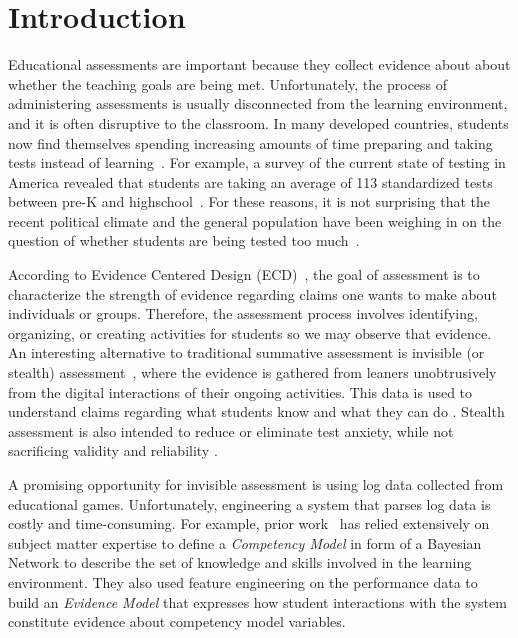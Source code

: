 \documentclass{sigchi}
\begin{document}
\section{Introduction}
Educational assessments are important because they collect evidence about about  whether  the teaching goals are being met.
Unfortunately, the process of  administering assessments is usually disconnected from the learning environment, and  it is often  disruptive to the classroom. 
In many developed countries, students now find themselves spending increasing amounts of time preparing and taking tests instead of learning~\cite{hofman2015rebalancing}.
For example, a  survey of the current state of testing in America revealed that students are taking an average of 113 standardized tests between pre-K and highschool~\cite{lazarin2014testing}. 
For these reasons, it is not surprising that the recent political climate and the general population have been weighing in on the question of whether students are being tested too much~\cite{lazarin2014testing}.


According to Evidence Centered Design (ECD)~\cite{mislevy2012design}, the goal of assessment is to characterize the strength of evidence regarding claims one wants to make about individuals or groups.
Therefore, the assessment process involves identifying, organizing, or creating activities for students so we may observe that evidence.
An interesting alternative to traditional summative assessment is invisible (or stealth) assessment~\cite{shute2013stealth},
where the evidence is gathered from leaners unobtrusively from the digital interactions of their ongoing activities.
This data is used  to understand claims regarding what students know and what they can do \cite{shute2009melding}.
Stealth assessment is also intended to reduce or eliminate test anxiety, while not sacrificing validity and reliability \cite{shute2008you}.



A promising opportunity for invisible assessment is using log data collected from educational games.
Unfortunately, engineering a system that parses log data is costly and time-consuming.
For example, prior work~\cite{shute2013stealth, shute2009melding} has relied extensively on subject matter expertise to define a \textit{Competency Model} in form of a Bayesian Network to describe the set of knowledge and skills involved in the learning environment.
They also used feature engineering on the performance data to build an \textit{Evidence Model} that expresses how student interactions with the system constitute evidence about competency model variables.
\end{document}

